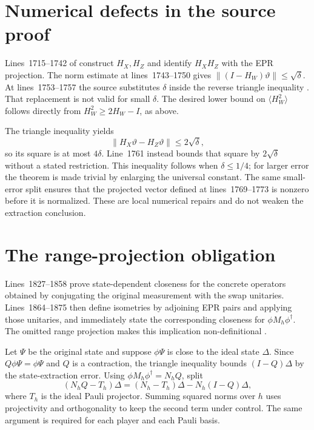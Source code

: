 \documentclass[11pt]{article}
\begin{document}
\section{Numerical defects in the source proof}

Lines~1715--1742 of
construct $H_X,H_Z$ and identify $H_XH_Z$ with the EPR projection.  The norm
estimate at lines~1743--1750 gives
$\lVert(I-H_W)\vartheta\rVert\leq\sqrt\delta$.  At lines~1753--1757 the
source substitutes $\delta$ inside the reverse triangle inequality
\cite[lines~1715--1783]{Ji2020MIPStar}.  That replacement is not valid for
small $\delta$.  The desired lower bound on
$\langle H_W^2\rangle$ follows directly from $H_W^2\geq2H_W-I$, as above.

The triangle inequality yields
\[
  \lVert H_X\vartheta-H_Z\vartheta\rVert\leq2\sqrt\delta,
\]
so its square is at most $4\delta$.  Line~1761 instead bounds that square by
$2\sqrt\delta$ without a stated restriction.  This inequality follows when
$\delta\leq1/4$; for larger error the theorem is made trivial by enlarging the
universal constant.  The same small-error split ensures that the projected
vector defined at lines~1769--1773 is nonzero before it is normalized.  These
are local numerical repairs and do not weaken the extraction conclusion.

\section{The range-projection obligation}

Lines~1827--1858 prove state-dependent closeness for the concrete operators
obtained by conjugating the original measurement with the swap unitaries.
Lines~1864--1875 then define isometries by adjoining EPR pairs and applying
those unitaries, and immediately state the corresponding closeness for
$\phi M_h\phi^\dagger$.  The omitted range projection makes this implication
non-definitional \cite[lines~1827--1875]{Ji2020MIPStar}.

Let $\Psi$ be the original state and suppose $\phi\Psi$ is close to the ideal
state $\Delta$.  Since $Q\phi\Psi=\phi\Psi$ and $Q$ is a contraction, the
triangle inequality bounds $(I-Q)\Delta$ by the state-extraction error.  Using
$\phi M_h\phi^\dagger=N_hQ$, split
\[
  (N_hQ-T_h)\Delta
  =(N_h-T_h)\Delta-N_h(I-Q)\Delta,
\]
where $T_h$ is the ideal Pauli projector.  Summing squared norms over $h$
uses projectivity and orthogonality to keep the second term under control.
The same argument is required for each player and each Pauli basis.
\end{document}
